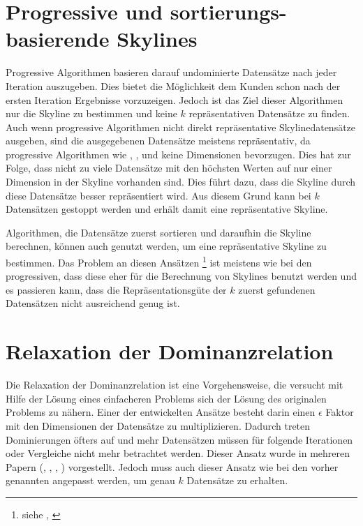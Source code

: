 \section{Progressive und sortierungs-basierende Skylines}
\label{ch:Forschungsstand:sec:progSortSky}
Progressive Algorithmen basieren darauf undominierte Datensätze nach jeder Iteration auszugeben. Dies bietet die Möglichkeit dem Kunden schon nach der ersten Iteration Ergebnisse vorzuzeigen. Jedoch ist das Ziel dieser Algorithmen nur die Skyline zu bestimmen und keine $k$ repräsentativen Datensätze zu finden.
Auch wenn progressive Algorithmen nicht direkt repräsentative Skylinedatensätze ausgeben, sind die ausgegebenen Datensätze meistens repräsentativ, da progressive Algorithmen wie \cite{Tan:2001:EPS:645927.672217}, \cite{papadias2005progressive}, \cite{Kossmann:2002:SSS:1287369.1287394} und \cite{Papadias:2003:OPA:872757.872814} keine Dimensionen bevorzugen. Dies hat zur Folge, dass nicht zu viele Datensätze mit den höchsten Werten auf nur einer Dimension in der Skyline vorhanden sind. Dies führt dazu, dass die Skyline durch diese Datensätze besser repräsentiert wird. Aus diesem Grund kann bei $k$ Datensätzen gestoppt werden und erhält damit eine repräsentative Skyline.

Algorithmen, die Datensätze zuerst sortieren und daraufhin die Skyline berechnen, können auch genutzt werden, um eine repräsentative Skyline zu bestimmen. Das Problem an diesen Ansätzen \footnote{siehe \cite{1260846}, \cite{lee2010z}} ist meistens wie bei den progressiven, dass diese eher für die Berechnung von Skylines benutzt werden und es passieren kann, dass die Repräsentationsgüte der $k$ zuerst gefundenen Datensätzen nicht ausreichend genug ist.
\section{Relaxation der Dominanzrelation}
\label{ch:Forschungsstand:sec:relaxDomRel}
Die Relaxation der Dominanzrelation ist eine Vorgehensweise, die versucht mit Hilfe der Lösung eines einfacheren Problems sich der Lösung des originalen Problems zu nähern. 
Einer der entwickelten Ansätze besteht darin einen $\epsilon$ Faktor mit den Dimensionen der Datensätze zu multiplizieren. Dadurch treten Dominierungen öfters auf und mehr Datensätzen müssen für folgende Iterationen oder Vergleiche nicht mehr betrachtet werden. Dieser Ansatz wurde in mehreren Papern (\cite{Koltun05approximatelydominating}, \cite{Su:2007:AMA:1418332.1418454}, \cite{Vassilvitskii:2005:ECS:1132633.1132648}, \cite{Xia:2008:SFD:1546682.1547149}) vorgestellt. Jedoch muss auch dieser Ansatz wie bei den vorher genannten angepasst werden, um genau $k$ Datensätze zu erhalten.

